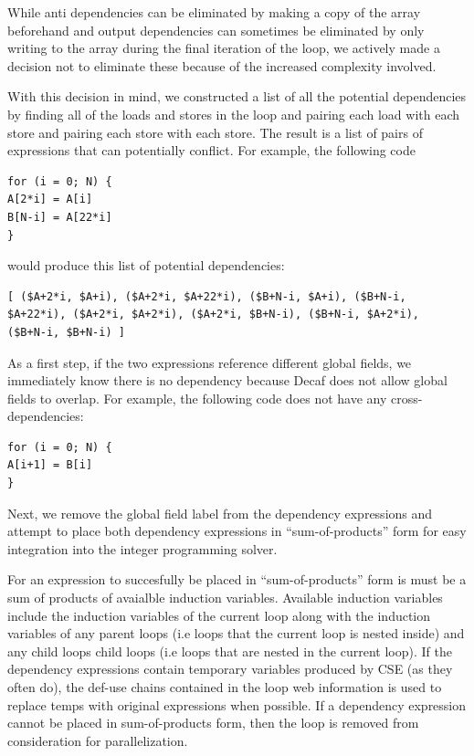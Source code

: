 \documentclass[11pt]{article}
\begin{document}
While anti dependencies can be eliminated by making a copy of the
array beforehand and output dependencies can sometimes be eliminated
by only writing to the array during the final iteration of the loop,
we actively made a decision not to eliminate these because of the increased
complexity involved. 

With this decision in mind, we constructed a list of all the potential
dependencies by finding all of the loads and stores in the loop and
pairing each load with each store and pairing each store with each
store. The result is a list of pairs of expressions that can
potentially conflict. For example, the following code 
\begin{verbatim}
for (i = 0; N) { 
A[2*i] = A[i]
B[N-i] = A[22*i]
}
\end{verbatim}
would produce this list of potential dependencies: 
\begin{verbatim}
[ ($A+2*i, $A+i), ($A+2*i, $A+22*i), ($B+N-i, $A+i), ($B+N-i,
$A+22*i), ($A+2*i, $A+2*i), ($A+2*i, $B+N-i), ($B+N-i, $A+2*i),
($B+N-i, $B+N-i) ]
\end{verbatim}


As a first step, if the two expressions
reference different global fields, we immediately know there is no
dependency because Decaf does not allow global fields to overlap. For
example, the following code does not have any cross-dependencies: 

\begin{verbatim}
for (i = 0; N) {
A[i+1] = B[i]
}
\end{verbatim}

Next, we remove the global field label from the dependency expressions
and attempt to place both dependency expressions in
``sum-of-products'' form for easy integration into the integer
programming solver. 

For an expression to succesfully be placed in ``sum-of-products'' form
is must be a sum of products of avaialble induction
variables. Available induction variables include the induction
variables of the current loop along with the induction variables of
any parent loops (i.e loops that the current loop is nested inside)
and any child loops child loops (i.e loops that are nested in the
current loop). If the dependency expressions contain temporary variables produced
by CSE (as they often do), the def-use chains contained in the loop
web information is used to replace temps with original expressions
when possible. If a dependency expression cannot be placed in sum-of-products form,
then the loop is removed from consideration for parallelization. 
\end{document}
